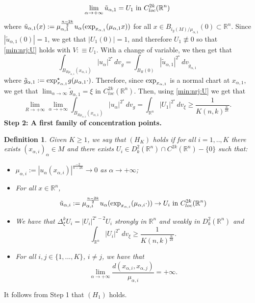 \documentclass[reqno]{amsart}
\newtheorem{defi}{Definition}[section]
\def \rn {\mathbb{R}^n}
\def \crit {2^\star}
\def \ua {u_\alpha}
\def \xaun {x_{\alpha,1}}
\def \xai {x_{\alpha,i}}
\def \maun {\mu_{\alpha,1}}
\def \mai {\mu_{\alpha,i}}
\def \tuaun {\tilde{u}_{\alpha,1}}
\def \tuai {\tilde{u}_{\alpha,i}}
\def \xaj {x_{\alpha,j}}
\begin{document}
\begin{equation*}
\lim_{\alpha\to +\infty}\tuaun=U_1\hbox{ in }C^{2k}_{loc}(\rn)
\end{equation*}
where $\tuaun(x):=\maun^{\frac{n-2k}{2}}\ua(\hbox{exp}_{\xaun}(\maun x))$ for all $x\in B_{i_g(M)/\maun}(0)\subset\rn$. Since $|\tuaun(0)|=1$, we get that $|U_1(0)|=1$, and therefore $U_1\not\equiv 0$ so that \eqref{min:nrj:U} holds with $V:\equiv U_1$. With a change of variable, we then get that
$$\int_{B_{R\maun}(\xaun)}|\ua|^{\crit}\, dv_g=\int_{B_R(0)}|\tuaun|^{\crit}\, dv_{\tilde{g}_{\alpha,1}}$$
where $\tilde{g}_{\alpha,1}:=\hbox{exp}_{\xaun}^\star g(\maun\cdot)$. Therefore, since $\hbox{exp}_{\xaun}$ is a normal chart at $\xaun$, we get that $\lim_{\alpha\to\infty}\tilde{g}_{\alpha,1}=\xi$ in $C^{2k}_{loc}(\rn)$. Then, using \eqref{min:nrj:U} we get that
\begin{equation}\label{ineq:21}
\lim_{R\to +\infty}\lim_{\alpha\to +\infty}\int_{B_{R\maun}(\xaun)}|\ua|^{\crit}\, dv_g=\int_{\rn}|U_1|^{\crit}\, dv_\xi\geq \frac{1}{K(n,k)^{\frac{n}{2k}}}.
\end{equation}
{\bf Step 2: A first family of concentration points.} 
\begin{defi} Given $K\geq 1$, we say that $(H_{K})$ holds if for all $i=1,..,K$ there exists $(\xai)_\alpha\in M$ and there exists $U_i\in D_k^2(\rn)\cap C^{2k}(\rn)-\{0\}$ such that:
\begin{itemize}
\item $\mai:=|\ua(\xai)|^{\frac{-2}{n-2k}}\to 0$ as  $\alpha\to +\infty$;
\item For all $x\in\rn$,
\begin{equation}\label{cv:tuai}
\tuai :=\mai^{\frac{n-2k}{2}}\ua(\hbox{exp}_{\xai}(\mai \cdot))\to U_i\hbox{ in }C^{2k}_{loc}(\rn)
\end{equation}
\item We have that $\Delta_\xi^k U_i=|U_i|^{\crit-2}U_i$ strongly in $\rn$ and weakly in $D_k^2(\rn)$ and
\begin{equation*}
\int_{\rn}|U_i|^{\crit}\, dv_\xi\geq \frac{1}{K(n,k)^{\frac{n}{2k}}}.
\end{equation*}
\item For all $i,j\in \{1,...,K\}$, $i\neq j$, we have that
\begin{equation}\label{lim:d:infty}
\lim_{\alpha\to +\infty}\frac{d(\xai,\xaj)}{\mai}=+\infty.
\end{equation}
\end{itemize}
\end{defi}
It follows from Step 1 that $(H_1)$ holds. 
\end{document}
